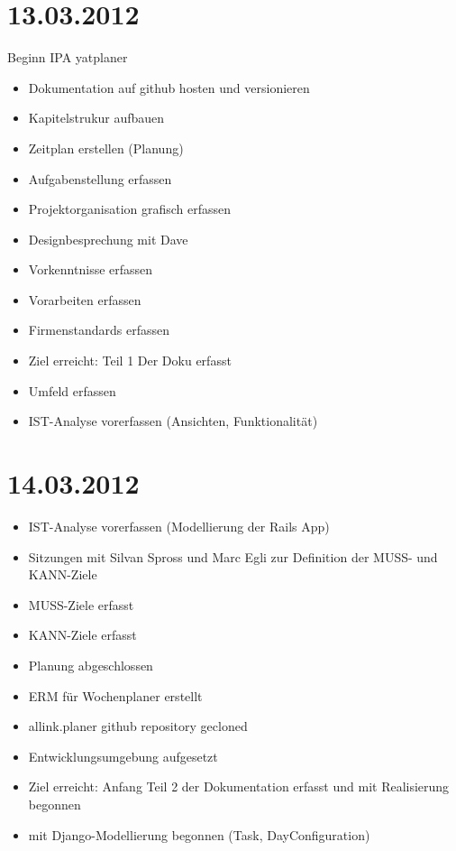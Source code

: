 \section{13.03.2012}
Beginn IPA yatplaner
\begin{itemize}
    \item Dokumentation auf github hosten und versionieren
    \item Kapitelstrukur aufbauen 
    \item Zeitplan erstellen (Planung)
    \item Aufgabenstellung erfassen
    \item Projektorganisation grafisch erfassen
    \item Designbesprechung mit Dave
    \item Vorkenntnisse erfassen
    \item Vorarbeiten erfassen
    \item Firmenstandards erfassen
    \item Ziel erreicht: Teil 1 Der Doku erfasst
    \item Umfeld erfassen
    \item IST-Analyse vorerfassen (Ansichten, Funktionalität)
\end{itemize}
\section{14.03.2012}
\begin{itemize}
    \item IST-Analyse vorerfassen (Modellierung der Rails App)
    \item Sitzungen mit Silvan Spross und Marc Egli zur Definition der MUSS- und KANN-Ziele
    \item MUSS-Ziele erfasst
    \item KANN-Ziele erfasst
    \item Planung abgeschlossen
    \item ERM für Wochenplaner erstellt
    \item allink.planer github repository gecloned
    \item Entwicklungsumgebung aufgesetzt
    \item Ziel erreicht: Anfang Teil 2 der Dokumentation erfasst und mit Realisierung begonnen
    \item mit Django-Modellierung begonnen (Task, DayConfiguration)
\end{itemize}
